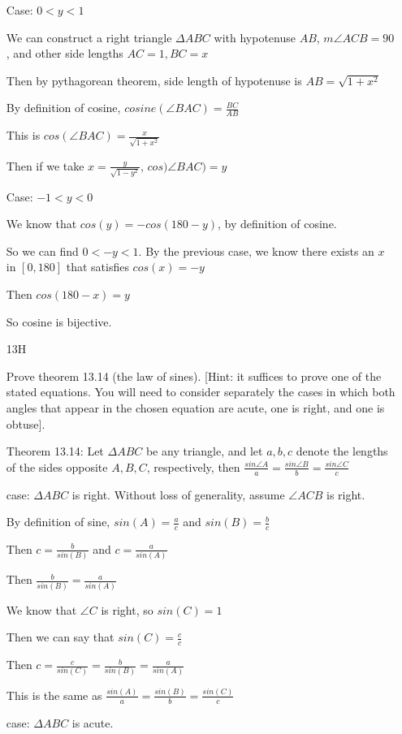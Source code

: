 \documentclass[11pt]{article}
\begin{document}
\begin{itemize}
		Case: $0 < y < 1$

		We can construct a right triangle $\Delta ABC$ with hypotenuse $AB$, $m \angle ACB = 90$, and other side lengths $AC = 1, BC = x$

		Then by pythagorean theorem, side length of hypotenuse is $AB = \sqrt{1 + x^2}$

		By definition of cosine, $cosine(\angle BAC) = \frac{BC}{AB}$

		This is $cos(\angle BAC) = \frac{x}{\sqrt{1 +x^2}}$

		Then if we take $x = \frac{y}{\sqrt{1-y^2}}$, $cos)\angle BAC) = y$

		Case: $-1 < y < 0$

		We know that $cos(y) = -cos(180 - y)$, by definition of cosine.

		So we can find $0 < -y < 1$. By the previous case, we know there exists an $x$ in $[0,180]$ that satisfies $cos(x) = -y$

		Then $cos(180 - x) = y$

		So cosine is bijective.

	\item[13H]

	Prove theorem 13.14 (the law of sines). [Hint: it suffices to prove one of the stated equations. You will need to consider separately the cases in which both angles that appear in the chosen equation are acute, one is right, and one is obtuse].

	Theorem 13.14: Let $\Delta ABC$ be any triangle, and let $a,b,c$ denote the lengths of the sides opposite $A,B,C$, respectively, then $\frac{sin \angle A}{a} = \frac{sin \angle B}{b} = \frac{sin \angle C}{c}$

	case: $\Delta ABC$ is right. Without loss of generality, assume $\angle ACB$ is right.

	By definition of sine, $sin(A) = \frac{a}{c}$ and $sin(B) = \frac{b}{c}$

	Then $c = \frac{b}{sin(B)}$ and $c = \frac{a}{sin(A)}$

	Then $\frac{b}{sin(B)} = \frac{a}{sin(A)}$

	We know that $\angle C$ is right, so $sin(C) = 1$

	Then we can say that $sin(C) = \frac{c}{c}$

	Then $c = \frac{c}{sin(C)} = \frac{b}{sin(B)} = \frac{a}{sin(A)}$

	This is the same as $\frac{sin(A)}{a} = \frac{sin(B)}{b} = \frac{sin(C)}{c}$

	case: $\Delta ABC$ is acute. 


\end{itemize}
\end{document}
